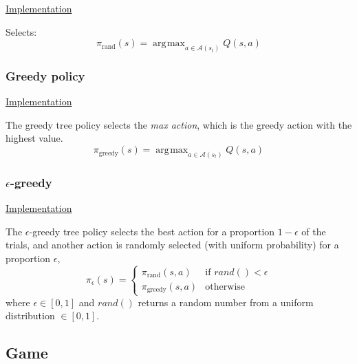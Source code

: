 \documentclass{article}
\DeclareMathOperator*{\argmax}{\arg\!\max}
\begin{document}
\noindent
\href{https://github.com/davidrobles/mlnd-capstone-code/blob/master/capstone/policy/greedy.py}
     {Implementation}
\break

Selects:
%
\begin{equation}
    \pi_{\textrm{rand}}(s) = \argmax_{a \in \mathcal{A}(s_t)} Q(s, a)
\end{equation}

\subsubsection{Greedy policy}

\noindent
\href{https://github.com/davidrobles/mlnd-capstone-code/blob/master/capstone/policy/greedy.py}
     {Implementation}
\break

The greedy tree policy selects the \emph{max action}, which is the greedy action with the highest
value.
%
\begin{equation}
    \pi_{\textrm{greedy}}(s) = \argmax_{a \in \mathcal{A}(s_t)} Q(s, a)
\end{equation}

\subsubsection{$\epsilon$-greedy}

\noindent
\href{https://github.com/davidrobles/mlnd-capstone-code/blob/master/capstone/policy/egreedy.py}
     {Implementation}
\break

The $\epsilon$-greedy tree policy selects the best action for a proportion $1 - \epsilon$ of the
trials, and another action is randomly selected (with uniform probability) for a proportion
$\epsilon$,
%
\begin{equation}
    \pi_{\epsilon}(s) = \left\{
     \begin{array}{lr}
         \pi_{\textrm{rand}}(s,a) & \text{if } rand() < \epsilon\\
         \pi_{\textrm{greedy}}(s,a) & \text{otherwise}
     \end{array}
   \right.
\end{equation}
%
where $\epsilon \in [0, 1]$ and $rand()$ returns a random number from a uniform distribution $\in
[0, 1]$.

\subsection{Game}
\end{document}
